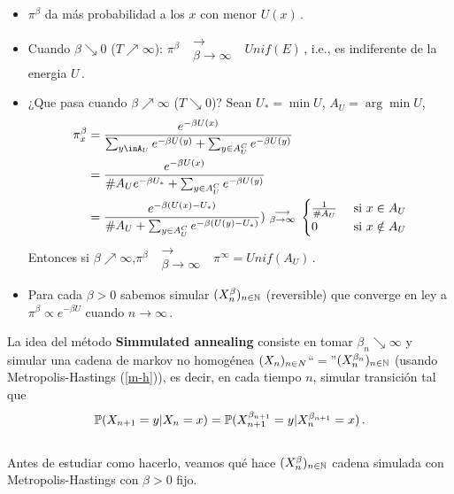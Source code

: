 \begin{remark}
\beforeitemize
\begin{itemize}
    \item $\pi^\beta$ da más probabilidad a los $x$ con menor $U(x)$\,.
    \item Cuando $\beta \searrow 0$ ($T\nearrow\infty$): $\pi^\beta\mbox{ }\substack{\longrightarrow \\ \beta\to\infty}\mbox{ }Unif(E)$\,,
    i.e., es indiferente de la energia $U$\,.
    \item ¿Que pasa cuando $\beta\nearrow \infty$ ($T\searrow 0$)?
    \newline Sean $U_*=\min U$, $A_U=\arg\min U$,
    \begin{alignat*}{2}
        \pi^\beta_x & = \displaystyle\frac{e^{-\beta U(x)}}{\sum_{y\inA_U}e^{-\beta U(y)}+\sum_{y\in A^C_U}e^{-\beta U(y)}} \\
         & = \displaystyle\frac{e^{-\beta U(x)}}{\# A_U e^{-\beta U_*}+\sum_{y\in A^C_U}e^{-\beta U(y)}} \\
         & = \displaystyle\frac{e^{-\beta (U(x)-U_*)}}{\# A_U +\sum_{y\in A^C_U}e^{-\beta (U(y)-U_*)}}) \mbox{ }\substack{\longrightarrow \\ \beta\to\infty}\mbox{ }\begin{cases}
    \frac{1}{\# A_U}  & \mbox{ si } x\in A_U  \\
    0  & \mbox{ si } x \notin A_U
    \end{cases}
    \end{alignat*}
    Entonces si $\beta\nearrow \infty$,\espacio $\pi^\beta\mbox{ }\substack{\longrightarrow \\ \beta\to\infty}\mbox{ }\pi^\infty=Unif(A_U)$\,.
    \item Para cada $\beta>0$ sabemos simular $(X^\beta_n)_{n\in\N}$ (reversible) que converge en ley a $\pi^\beta\propto e^{-\beta U}$ cuando $n\to\infty$\,.
\end{itemize}
\end{remark}
La idea del método \textbf{Simmulated annealing} consiste en tomar $\beta_n\searrow \infty$ y simular una cadena de markov no homogénea $\xcm$``$=$''$(X_n^{\beta_n})_{n\in\N}$ (usando Metropolis-Hastings (\ref{m-h})), es decir, en cada tiempo $n$, simular transición tal que
$$ \P(X_{n+1}=y|X_n=x)=\P(X_{n+1}^{\beta_{n+1}}=y|X_n^{\beta_{n+1}}=x)\,.$$
\vspace{.5cm}\\
Antes de estudiar como hacerlo, veamos qu\'e hace $(X^\beta_n)_{n\in\N}$ cadena simulada con Metropolis-Hastings con $\beta>0$ fijo.

